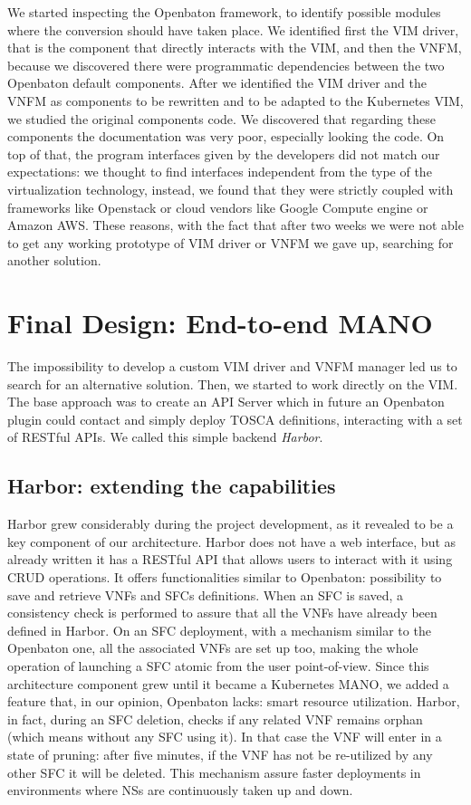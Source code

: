 We started inspecting the Openbaton framework, to identify possible modules
where the conversion should have taken place. We identified first the VIM
driver, that is the component that directly interacts with the VIM, and then the
VNFM, because we discovered there were programmatic dependencies between the two
Openbaton default components. After we identified the VIM driver and the VNFM as
components to be rewritten and to be adapted to the Kubernetes VIM, we studied
the original components code. We discovered that regarding these components the
documentation was very poor, especially looking the code. On top of that, the
program interfaces given by the developers did not match our expectations: we
thought to find interfaces independent from the type of the virtualization
technology, instead, we found that they were strictly coupled with frameworks
like Openstack or cloud vendors like Google Compute engine or Amazon AWS. These
reasons, with the fact that after two weeks we were not able to get any working
prototype of VIM driver or VNFM we gave up, searching for another solution.

\section{Final Design: End-to-end MANO}

The impossibility to develop a custom VIM driver and VNFM manager led us to
search for an alternative solution. Then, we started to work directly on the
VIM. The base approach was to create an API Server which in future an Openbaton
plugin could contact and simply deploy TOSCA definitions, interacting with a set
of RESTful APIs. We called this simple backend \emph{Harbor}.

\subsection{Harbor: extending the capabilities}
\label{chap:archimpl:sec:secondattempt:sub:harbor}
Harbor grew considerably during the project development, as it revealed to be a
key component of our architecture. Harbor does not have a web interface, but as
already written it has a RESTful API that allows users to interact with it using
CRUD operations. It offers functionalities similar to Openbaton: possibility to
save and retrieve VNFs and SFCs definitions. When an SFC is saved, a consistency
check is performed to assure that all the VNFs have already been defined in
Harbor. On an SFC deployment, with a mechanism similar to the Openbaton one, all
the associated VNFs are set up too, making the whole operation of launching a
SFC atomic from the user point-of-view. Since this architecture component grew
until it became a Kubernetes MANO, we added a feature that, in our opinion,
Openbaton lacks: smart resource utilization. Harbor, in fact, during an SFC
deletion, checks if any related VNF remains orphan (which means without any SFC
using it). In that case the VNF will enter in a state of pruning: after five
minutes, if the VNF has not be re-utilized by any other SFC it will be deleted.
This mechanism assure faster deployments in environments where NSs are
continuously taken up and down.

